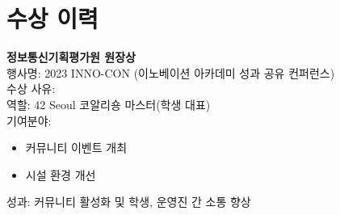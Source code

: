 \documentclass[11pt, a4paper]{article}
\begin{document}
\section{수상 이력}
\textbf{정보통신기획평가원 원장상}\\
\hspace*{0.5cm}행사명: 2023 INNO-CON (이노베이션 아카데미 성과 공유 컨퍼런스)\\
\hspace*{0.5cm}수상 사유:\\
\hspace*{1cm}역할: 42 Seoul 코알리숑 마스터(학생 대표)\\
\hspace*{1cm}기여분야:
\begin{itemize}
    \begin{itemize}
        \item 커뮤니티 이벤트 개최
        \item 시설 환경 개선
    \end{itemize}
\end{itemize}
\hspace*{0.5cm}성과: 커뮤니티 활성화 및 학생, 운영진 간 소통 향상
\end{document}
